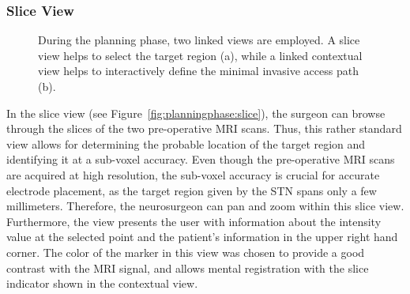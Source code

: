 \documentclass[journal]{vgtc}                %
\begin{document}
\subsubsection{Slice View}\label{sec:overview:planning:slice}
\begin{figure}
    \centering    
    \caption{During the planning phase, two linked views are employed. A slice view helps to select the target region (a), while a linked contextual view helps to interactively define the minimal invasive access path (b).}
    \label{fig:planningphase:view}
\end{figure}

In the slice view (see Figure~\ref{fig:planningphase:slice}), the surgeon can browse through the slices of the two pre-operative MRI scans. Thus, this rather standard view allows for determining the probable location of the target region and identifying it at a sub-voxel accuracy. Even though the pre-operative MRI scans are acquired at high resolution, the sub-voxel accuracy is crucial for accurate electrode placement, as the target region given by the STN spans only a few millimeters. Therefore, the neurosurgeon can pan and zoom within this slice view. Furthermore, the view presents the user with information about the intensity value at the selected point and the patient's information in the upper right hand corner. The color of the marker in this view was chosen to provide a good contrast with the MRI signal, and allows mental registration with the slice indicator shown in the contextual view.
\end{document}
